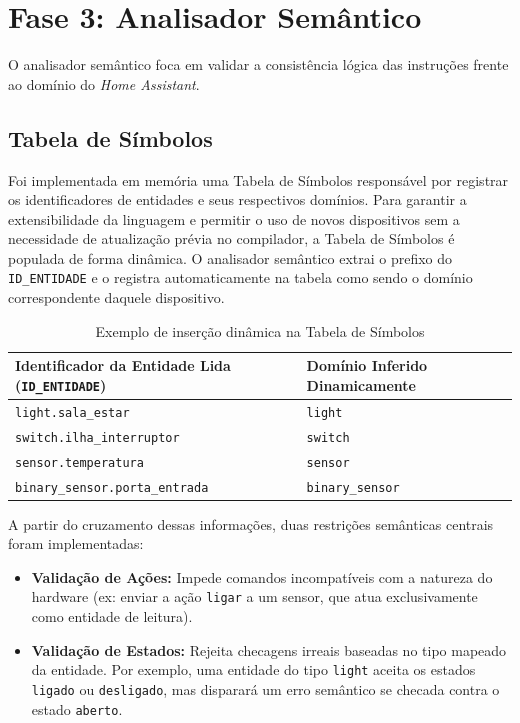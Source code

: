 \documentclass[12pt, a4paper]{article}
\begin{document}
\section{Fase 3: Analisador Semântico}
O analisador semântico foca em validar a consistência lógica das instruções frente ao domínio do \textit{Home Assistant}.

\subsection{Tabela de Símbolos}
Foi implementada em memória uma Tabela de Símbolos responsável por registrar os identificadores de entidades e seus respectivos domínios. Para garantir a extensibilidade da linguagem e permitir o uso de novos dispositivos sem a necessidade de atualização prévia no compilador, a Tabela de Símbolos é populada de forma dinâmica. O analisador semântico extrai o prefixo do \texttt{ID\_ENTIDADE} e o registra automaticamente na tabela como sendo o domínio correspondente daquele dispositivo.

\begin{table}[H]
\centering
\begin{tabular}{@{}ll@{}}
\toprule
\textbf{Identificador da Entidade Lida (\texttt{ID\_ENTIDADE})} & \textbf{Domínio Inferido Dinamicamente} \\ \midrule
\texttt{light.sala\_estar} & \texttt{light} \\
\texttt{switch.ilha\_interruptor} & \texttt{switch} \\
\texttt{sensor.temperatura} & \texttt{sensor} \\
\texttt{binary\_sensor.porta\_entrada} & \texttt{binary\_sensor} \\ \bottomrule
\end{tabular}
\caption{Exemplo de inserção dinâmica na Tabela de Símbolos}
\end{table}

A partir do cruzamento dessas informações, duas restrições semânticas centrais foram implementadas:
\begin{itemize}
    \item \textbf{Validação de Ações:} Impede comandos incompatíveis com a natureza do hardware (ex: enviar a ação \texttt{ligar} a um sensor, que atua exclusivamente como entidade de leitura).
    \item \textbf{Validação de Estados:} Rejeita checagens irreais baseadas no tipo mapeado da entidade. Por exemplo, uma entidade do tipo \texttt{light} aceita os estados \texttt{ligado} ou \texttt{desligado}, mas disparará um erro semântico se checada contra o estado \texttt{aberto}.
\end{itemize}
\end{document}
